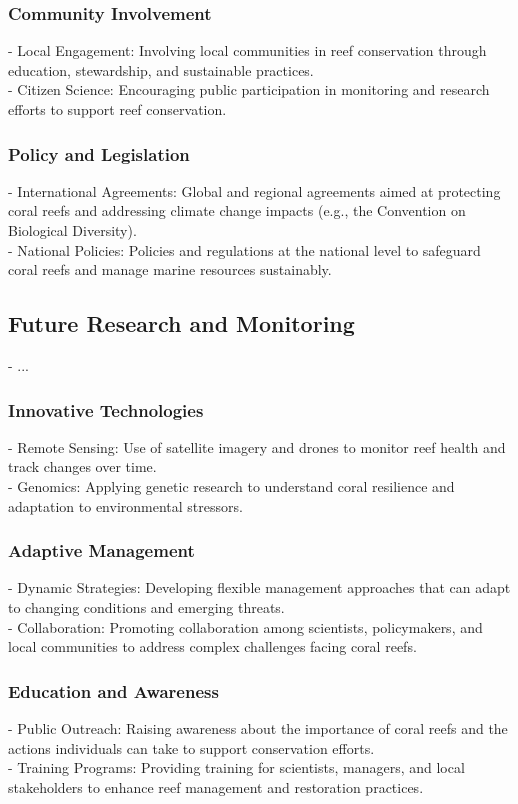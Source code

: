 \subsubsection{Community Involvement}
- Local Engagement: Involving local communities in reef conservation through education, stewardship, and sustainable practices. \\
- Citizen Science: Encouraging public participation in monitoring and research efforts to support reef conservation. 
\subsubsection{Policy and Legislation}
- International Agreements: Global and regional agreements aimed at protecting coral reefs and addressing climate change impacts (e.g., the Convention on Biological Diversity). \\
- National Policies: Policies and regulations at the national level to safeguard coral reefs and manage marine resources sustainably. 

\subsection{Future Research and Monitoring}
- ... 
\subsubsection{Innovative Technologies}
- Remote Sensing: Use of satellite imagery and drones to monitor reef health and track changes over time. \\
- Genomics: Applying genetic research to understand coral resilience and adaptation to environmental stressors. 
\subsubsection{Adaptive Management}
- Dynamic Strategies: Developing flexible management approaches that can adapt to changing conditions and emerging threats. \\
- Collaboration: Promoting collaboration among scientists, policymakers, and local communities to address complex challenges facing coral reefs.
\subsubsection{Education and Awareness}
- Public Outreach: Raising awareness about the importance of coral reefs and the actions individuals can take to support conservation efforts. \\
- Training Programs: Providing training for scientists, managers, and local stakeholders to enhance reef management and restoration practices.



